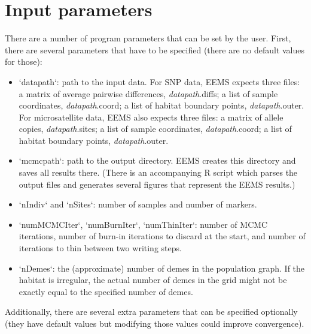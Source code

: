 \documentclass[a4paper,10pt,DIV=15,mpinclude=true]{scrartcl}
\begin{document}
\newpage
\section{Input parameters}

There are a number of program parameters that can be set by the user. First, there are several parameters that have to be specified (there are no default values for those):
\begin{itemize}
  \item `datapath`: path to the input data. For SNP data, EEMS expects three files: a matrix of average pairwise differences, \textit{datapath}.diffs; a list of sample coordinates, \textit{datapath}.coord; a list of habitat boundary points, \textit{datapath}.outer. For microsatellite data, EEMS also expects three files: a matrix of allele copies, \textit{datapath}.sites; a list of sample coordinates, \textit{datapath}.coord; a list of habitat boundary points, \textit{datapath}.outer.
  \item `mcmcpath`: path to the output directory. EEMS creates this directory and saves all results there. (There is an accompanying R script which parses the output files and generates several figures that represent the EEMS results.)
  \item `nIndiv` and `nSites`: number of samples and number of markers.
  \item `numMCMCIter`, `numBurnIter`, `numThinIter`: number of MCMC iterations, number of burn-in iterations to discard at the start, and number of iterations to thin between two writing steps.
  \item `nDemes`: the (approximate) number of demes in the population graph. If the habitat is irregular, the actual number of demes in the grid might not be exactly equal to the specified number of demes.
\end{itemize}

Additionally, there are several extra parameters that can be specified optionally (they have default values but modifying those values could improve convergence).
\end{document}

